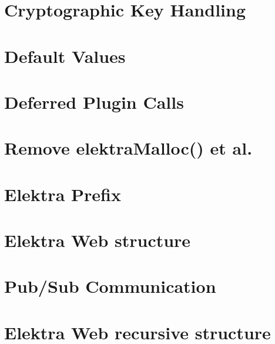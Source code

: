 \let\mypdfximage\pdfximage\def\pdfximage{\immediate\mypdfximage}\documentclass[twoside]{book}
\newcommand{\+}{\discretionary{\mbox{\scriptsize$\hookleftarrow$}}{}{}}
\begin{document}
\chapter{Cryptographic Key Handling}
\label{doc_decisions_cryptograhic_key_handling_md}

\chapter{Default Values}
\label{doc_decisions_default_values_md}

\chapter{Deferred Plugin Calls}
\label{doc_decisions_deferred_plugin_calls_md}

\chapter{Remove elektra\+Malloc() et al.}
\label{doc_decisions_elektra_malloc_md}

\chapter{Elektra Prefix}
\label{doc_decisions_elektra_prefix_md}

\chapter{Elektra Web structure}
\label{doc_decisions_elektra_web_md}

\chapter{Pub/\+Sub Communication}
\label{doc_decisions_elektra_web_pubsub_md}

\chapter{Elektra Web recursive structure}
\label{doc_decisions_elektra_web_recursive_md}

\end{document}
